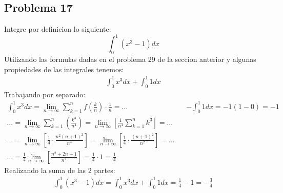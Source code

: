 \documentclass{article}
\begin{document}
      \subsection{Problema 17}
      Integre por definicion lo siguiente:
      $$\int_{0}^{1}(x^3 -1)dx$$
      Utilizando las formulas dadas en el problema 29 de la seccion anterior y algunas propiedades de las integrales tenemos:
      \begin{align*}
        \int_{0}^{1} x^3dx + \int_{0}^{1} 1dx
      \end{align*}
      Trabajando por separado:
      \begin{align*}
        \int_{0}^{1} x^3dx =\lim_{n\to\infty} \sum_{k=1}^{n}f\left(\frac{k}{n}\right)\cdot\frac{1}{n} = \dots && -\int_{0}^{1}1dx = -1(1-0) = -1 \\
        \dots = \lim_{n\to\infty} \sum_{k=1}^{n} \left(\frac{k^3}{n^4}\right) = \lim_{n\to\infty} \left[\frac{1}{n^4}\sum_{k=1}^{n}k^3\right]=\dots \\ \dots = \lim_{n\to\infty}\left[\frac{1}{4}\cdot\frac{n^2(n+1)^2}{n^4}\right] = \lim_{n\to\infty}\left[\frac{1}{4}\cdot\frac{(n+1)^2}{n^2}\right]= \dots \\ \dots = \frac{1}{4} \lim_{n\to\infty}\left[\frac{n^2+2n+1}{n^2}\right] = \frac{1}{4} \cdot 1 = \frac{1}{4}
      \end{align*}
      Realizando la suma de las 2 partes:
      \begin{align*}
        \int_{0}^{1}(x^3 -1)dx = \int_{0}^{1} x^3dx + \int_{0}^{1} 1dx  = \frac{1}{4} -1 = -\frac{3}{4}
      \end{align*}
\end{document}
